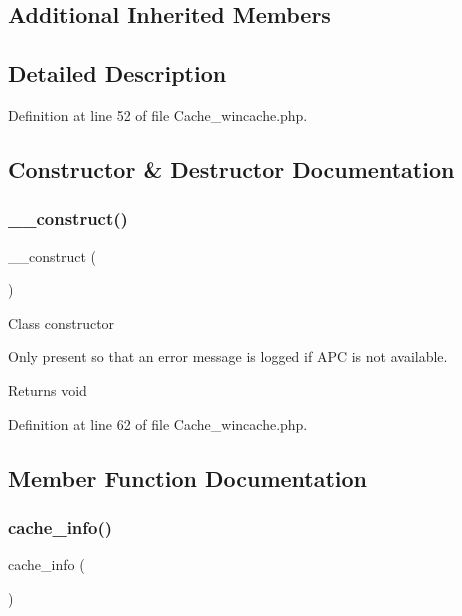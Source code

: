 \subsection*{Additional Inherited Members}


\subsection{Detailed Description}


Definition at line 52 of file Cache\+\_\+wincache.\+php.



\subsection{Constructor \& Destructor Documentation}
\mbox{\label{class_c_i___cache__wincache_a095c5d389db211932136b53f25f39685}} 
\subsubsection{\texorpdfstring{\_\_construct()}{\_\_construct()}}
{\footnotesize\ttfamily \+\_\+\+\_\+construct (\begin{DoxyParamCaption}{ }\end{DoxyParamCaption})}

Class constructor

Only present so that an error message is logged if A\+PC is not available.

\begin{DoxyReturn}{Returns}
void 
\end{DoxyReturn}


Definition at line 62 of file Cache\+\_\+wincache.\+php.



\subsection{Member Function Documentation}
\mbox{\label{class_c_i___cache__wincache_acb4742926a6fa901e4f0917e1a35ef4c}} 
\subsubsection{\texorpdfstring{cache\_info()}{cache\_info()}}
{\footnotesize\ttfamily cache\+\_\+info (\begin{DoxyParamCaption}{ }\end{DoxyParamCaption})}

